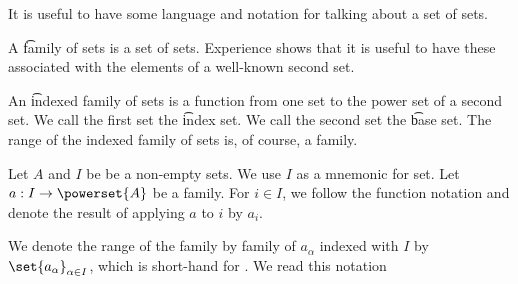 

It is useful to
have some language and
notation for talking about
a set of sets.


A \t{family} of sets
is a set of sets.
Experience shows that it is
useful to have these associated
with the elements of a well-known
second set.

An \t{indexed family of sets} is a function
from one set to the power set of a second set.
We call the first set the \t{index set}.
We call the second set the \t{base set}.
The range of the indexed family of sets is, of course, a family.




Let $A$ and $I$ be be a non-empty sets.
We use $I$ as a mnemonic for 
set.
Let $a: I \to \powerset{A}$ be a family.
For $i \in I$, we follow the function notation
and denote the result of applying $a$ to $i$ by
$a_{i}$.

We denote the range of the family by
family of $a_{\alpha}$ indexed with $I$
by $\set{a_{\alpha}}_{\alpha \in I}$, which is short-hand
for .
We read this notation 


